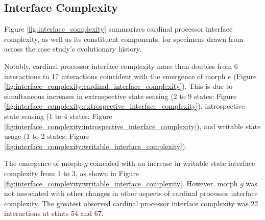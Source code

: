 


\subsection{Interface Complexity}

Figure \ref{fig:interface_complexity} summarizes cardinal processor interface complexity, as well as its constituent components, for specimens drawn from across the case study's evolutionary history.

Notably, cardinal processor interface complexity more than doubles from 6 interactions to 17 interactions coincident with the emergence of morph $e$ (Figure \ref{fig:interface_complexity:cardinal_interface_complexity}).
This is due to simultaneous increases in extrospective state sensing (2 to 9 states; Figure \ref{fig:interface_complexity:extrospective_interface_complexity}), introspective state sensing (1 to 4 states; Figure \ref{fig:interface_complexity:introspective_interface_complexity}), and writable state usage (1 to 2 states; Figure \ref{fig:interface_complexity:writable_interface_complexity}).

The emergence of morph $g$ coincided with an increase in writable state interface complexity from 1 to 3, as shown in Figure \ref{fig:interface_complexity:writable_interface_complexity}.
However, morph $g$ was not associated with other changes in other aspects of cardinal processor interface complexity.
The greatest observed cardinal processor interface complexity was 22 interactions at stints 54 and 67.

